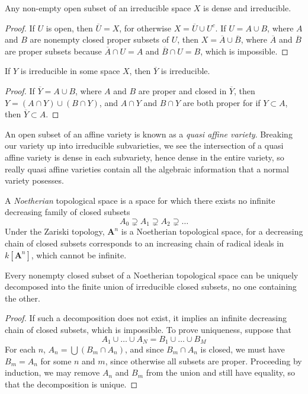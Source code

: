 \begin{theorem}
    Any non-empty open subset of an irreducible space $X$ is dense and irreducible.
\end{theorem}
\begin{proof}
    If $U$ is open, then $\overline{U} = X$, for otherwise $X = \overline{U} \cup U^c$. If $U = A \cup B$, where $A$ and $B$ are nonempty closed proper subsets of $U$, then $X = \overline{A} \cup \overline{B}$, where $\overline{A}$ and $\overline{B}$ are proper subsets because $\overline{A} \cap U = A$ and $\overline{B} \cap U = B$, which is impossible.
\end{proof}

\begin{corollary}
    If $Y$ is irreducible in some space $X$, then $\overline{Y}$ is irreducible.
\end{corollary}
\begin{proof}
    If $\overline{Y} = A \cup B$, where $A$ and $B$ are proper and closed in $\overline{Y}$, then $Y = (A \cap Y) \cup (B \cap Y)$, and $A \cap Y$ and $B \cap Y$ are both proper for if $Y \subset A$, then $\overline{Y} \subset A$.
\end{proof}

An open subset of an affine variety is known as a \emph{quasi affine variety}. Breaking our variety up into irreducible subvarieties, we see the intersection of a quasi affine variety is dense in each subvariety, hence dense in the entire variety, so really quasi affine varieties contain all the algebraic information that a normal variety posesses.

A \emph{Noetherian} topological space is a space for which there exists no infinite decreasing family of closed subsets
%
\[ A_0 \supsetneq A_1 \supsetneq A_2 \supsetneq \dots \]
%
Under the Zariski topology, $\mathbf{A}^n$ is a Noetherian topological space, for a decreasing chain of closed subsets corresponds to an increasing chain of radical ideals in $k[\mathbf{A}^n]$, which cannot be infinite.

\begin{theorem}
    Every nonempty closed subset of a Noetherian topological space can be uniquely decomposed into the finite union of irreducible closed subsets, no one containing the other.
\end{theorem}
\begin{proof}
    If such a decomposition does not exist, it implies an infinite decreasing chain of closed subsets, which is impossible. To prove uniqueness, suppose that
    \[ A_1 \cup \dots \cup A_N = B_1 \cup \dots \cup B_M \]
    For each $n$, $A_n = \bigcup (B_m \cap A_n)$, and since $B_m \cap A_n$ is closed, we must have $B_m = A_n$ for some $n$ and $m$, since otherwise all subsets are proper. Proceeding by induction, we may remove $A_n$ and $B_m$ from the union and still have equality, so that the decomposition is unique.
\end{proof}

